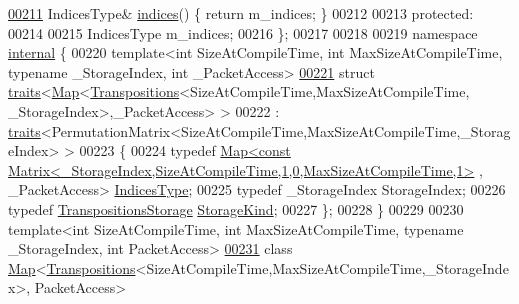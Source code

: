 \begin{DoxyCode}
\hyperlink{group___core___module_a678dfbd513871473bcd36bbc453eed8c}{00211}     IndicesType& \hyperlink{group___core___module_a678dfbd513871473bcd36bbc453eed8c}{indices}() \{ \textcolor{keywordflow}{return} m\_indices; \}
00212 
00213   \textcolor{keyword}{protected}:
00214 
00215     IndicesType m\_indices;
00216 \};
00217 
00218 
00219 \textcolor{keyword}{namespace }\hyperlink{namespaceinternal}{internal} \{
00220 \textcolor{keyword}{template}<\textcolor{keywordtype}{int} SizeAtCompileTime, \textcolor{keywordtype}{int} MaxSizeAtCompileTime, \textcolor{keyword}{typename} \_StorageIndex, \textcolor{keywordtype}{int} \_PacketAccess>
\hyperlink{struct_eigen_1_1internal_1_1traits_3_01_map_3_01_transpositions_3_01_size_at_compile_time_00_01_1a60846531a8bf67fbbfd4180820bbd1}{00221} \textcolor{keyword}{struct }\hyperlink{struct_eigen_1_1internal_1_1traits}{traits}<\hyperlink{group___core___module_class_eigen_1_1_map}{Map}<\hyperlink{group___core___module_class_eigen_1_1_transpositions}{Transpositions}<SizeAtCompileTime,MaxSizeAtCompileTime,
      \_StorageIndex>,\_PacketAccess> >
00222  : \hyperlink{struct_eigen_1_1internal_1_1traits}{traits}<PermutationMatrix<SizeAtCompileTime,MaxSizeAtCompileTime,\_StorageIndex> >
00223 \{
00224   \textcolor{keyword}{typedef} 
      \hyperlink{group___core___module_class_eigen_1_1_map}{Map<const Matrix<\_StorageIndex,SizeAtCompileTime,1,0,MaxSizeAtCompileTime,1>}
      , \_PacketAccess> \hyperlink{group___core___module_class_eigen_1_1_matrix}{IndicesType};
00225   \textcolor{keyword}{typedef} \_StorageIndex StorageIndex;
00226   \textcolor{keyword}{typedef} \hyperlink{struct_eigen_1_1_transpositions_storage}{TranspositionsStorage} \hyperlink{struct_eigen_1_1_permutation_storage}{StorageKind};
00227 \};
00228 \}
00229 
00230 \textcolor{keyword}{template}<\textcolor{keywordtype}{int} SizeAtCompileTime, \textcolor{keywordtype}{int} MaxSizeAtCompileTime, \textcolor{keyword}{typename} \_StorageIndex, \textcolor{keywordtype}{int} PacketAccess>
\hyperlink{class_eigen_1_1_map_3_01_transpositions_3_01_size_at_compile_time_00_01_max_size_at_compile_timecc993082d7c0ba51ca94b27e97da8dd3}{00231} \textcolor{keyword}{class }\hyperlink{group___core___module_class_eigen_1_1_map}{Map}<\hyperlink{group___core___module_class_eigen_1_1_transpositions}{Transpositions}<SizeAtCompileTime,MaxSizeAtCompileTime,\_StorageIndex>,
      PacketAccess>

\end{DoxyCode}
